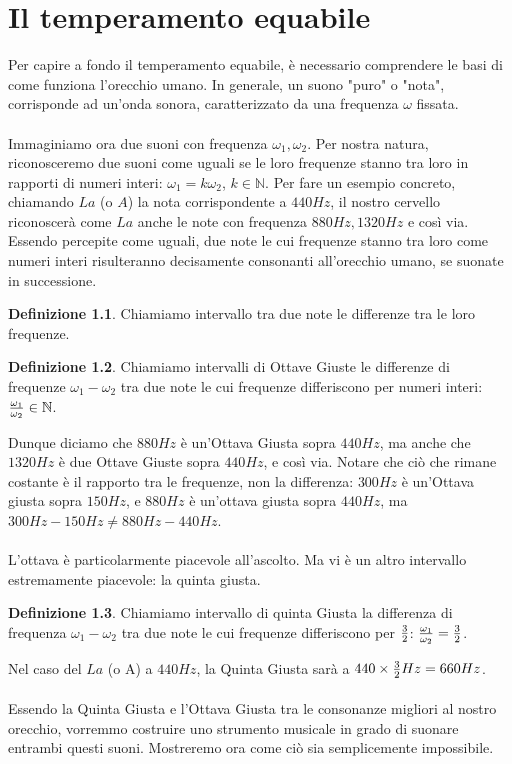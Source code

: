 \documentclass[12pt,a4paper]{report}
\theoremstyle{definition}
\newtheorem{Def}{Definizione}[chapter]
\theoremstyle{Theorem}
\theoremstyle{definition}
\theoremstyle{definition}
\theoremstyle{definition}
\begin{document}
	\chapter{Il temperamento equabile}
	Per capire a fondo il temperamento equabile, è necessario comprendere le basi di come funziona l'orecchio umano. In generale, un suono "puro" o "nota", corrisponde ad un'onda sonora, caratterizzato da una frequenza $\omega$ fissata.\\
	\\
	Immaginiamo ora due suoni con frequenza $\omega_1,\omega_2$. Per nostra natura, riconosceremo due suoni come uguali se le loro frequenze stanno tra loro in rapporti di numeri interi: $\omega_1=k\omega_2$, $k\in \mathbb{N}$. Per fare un esempio concreto, chiamando $La$ (o $A$) la nota corrispondente a $440 Hz$, il nostro cervello riconoscerà come $La$ anche le note con frequenza $880 Hz,1320 Hz$ e così via. Essendo percepite come uguali, due note le cui frequenze stanno tra loro come numeri interi risulteranno decisamente consonanti all'orecchio umano, se suonate in successione.
	\begin{Def}
		Chiamiamo intervallo tra due note le differenze tra le loro frequenze.
	\end{Def}
	\begin{Def}
		Chiamiamo intervalli di Ottave Giuste le differenze di frequenze $\omega_1-\omega_2$ tra due note le cui frequenze differiscono per numeri interi: ${\omega_1\over\omega_2}\in \mathbb{N}$.
	\end{Def}
	Dunque diciamo che $880Hz$ è un'Ottava Giusta sopra $440 Hz$, ma anche che $1320 Hz$ è due Ottave Giuste sopra $440 Hz$, e così via. Notare che ciò che rimane costante è il rapporto tra le frequenze, non la differenza: $300Hz$ è un'Ottava giusta sopra $150 Hz$, e $880Hz$ è un'ottava giusta sopra $440 Hz$, ma $300Hz-150Hz\neq 880Hz-440Hz$.\\
	\\
	L'ottava è particolarmente piacevole all'ascolto. Ma vi è un altro intervallo estremamente piacevole: la quinta giusta.
	\begin{Def}
		Chiamiamo intervallo di quinta Giusta la differenza di frequenza $\omega_1-\omega_2$ tra due note le cui frequenze differiscono per $3\over 2$: ${\omega_1\over\omega_2}={3\over 2}$.
	\end{Def}
	Nel caso del $La$ (o A) a $440 Hz$, la Quinta Giusta sarà a $440\times {3\over 2}Hz=660 Hz$.\\
	\\
	Essendo la Quinta Giusta e l'Ottava Giusta tra le consonanze migliori al nostro orecchio, vorremmo costruire uno strumento musicale in grado di suonare entrambi questi suoni. Mostreremo ora come ciò sia semplicemente impossibile.\\
\end{document}
